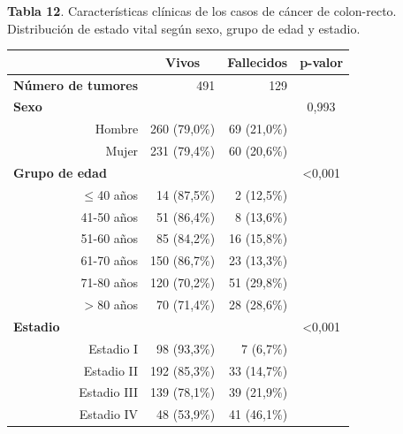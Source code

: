 \textbf{Tabla 12}. Características clínicas de los casos de cáncer de colon-recto. Distribución de  estado vital según sexo, grupo de edad y estadio.

\begin{table}[H]
		\centering
	\begin{tabular}{rrrc}
		\cline{2-4}
		\multicolumn{1}{l}{}                           & \multicolumn{1}{c}{\textbf{Vivos}} & \multicolumn{1}{c}{\textbf{Fallecidos}} & \multicolumn{1}{c}{\textbf{p-valor}} \\ \hline
		\multicolumn{1}{l}{\textbf{Número de tumores}} & 491            & 129                 &                  \\ \hline
		\multicolumn{1}{l}{\textbf{Sexo}}              &                &                     & 0,993            \\
		Hombre                                         & 260 (79,0\%)     & 69 (21,0\%)           &                  \\
		Mujer                                          & 231 (79,4\%)   & 60 (20,6\%)         &                  \\ \hline
		\multicolumn{1}{l}{\textbf{Grupo de edad}}     &                &                     & \textless{}0,001 \\
		$\leq$40 años                                     & 14 (87,5\%)    & 2 (12,5\%)          &                  \\
		41-50 años                                     & 51 (86,4\%)    & 8 (13,6\%)          &                  \\
		51-60 años                                     & 85 (84,2\%)    & 16 (15,8\%)         &                  \\
		61-70 años                                     & 150 (86,7\%)   & 23 (13,3\%)         &                  \\
		71-80 años                                     & 120 (70,2\%)   & 51 (29,8\%)         &                  \\
		$>$80 años                                  & 70 (71,4\%)    & 28 (28,6\%)         &                  \\ \hline
		\multicolumn{1}{l}{\textbf{Estadio}}           &                &                     & \textless{}0,001 \\
		Estadio I                                      & 98 (93,3\%)    & 7 (6,7\%)           &                  \\
		Estadio II                                     & 192 (85,3\%)   & 33 (14,7\%)         &                  \\
		Estadio III                                    & 139 (78,1\%)   & 39 (21,9\%)         &                  \\
		Estadio IV                                     & 48 (53,9\%)    & 41 (46,1\%)         &                  \\ \hline
	\end{tabular}
\end{table}

